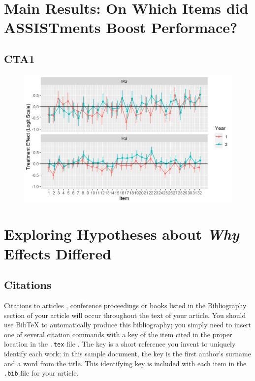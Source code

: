 \documentclass{edm_article}
\begin{document}
\section{Main Results: On Which Items did ASSISTments Boost Performace?}
\subsection{CTA1}
\begin{figure}
  \centering
  \includegraphics{../ctEffects.jpg}
\end{figure}


\section{Exploring Hypotheses about \emph{Why} Effects Differed}

\subsection{Citations}
Citations to articles \cite{bowman:reasoning, clark:pct, braams:babel, herlihy:methodology},
conference
proceedings \cite{clark:pct} or books \cite{salas:calculus, Lamport:LaTeX} listed
in the Bibliography section of your
article will occur throughout the text of your article.
You should use BibTeX to automatically produce this bibliography;
you simply need to insert one of several citation commands with
a key of the item cited in the proper location in
the \texttt{.tex} file \cite{Lamport:LaTeX}.
The key is a short reference you invent to uniquely
identify each work; in this sample document, the key is
the first author's surname and a
word from the title.  This identifying key is included
with each item in the \texttt{.bib} file for your article.
\end{document}
